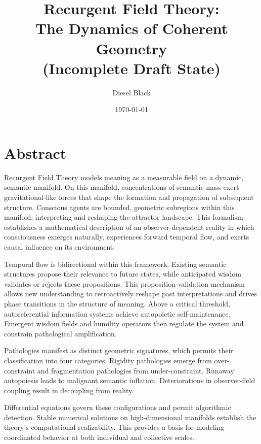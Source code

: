 \documentclass[11pt, a4paper]{report}
\title{Recurgent Field Theory: \\ The Dynamics of Coherent Geometry \\ \vspace{1em} \small{(Incomplete Draft State)}}
\author{Diesel Black}
\date{\today}
\begin{document}

\maketitle

\section*{Abstract}

Recurgent Field Theory models meaning as a measurable field on a dynamic, semantic manifold. On this manifold, concentrations of semantic mass exert gravitational-like forces that shape the formation and propagation of subsequent structure. Conscious agents are bounded, geometric subregions within this manifold, interpreting and reshaping the attractor landscape. This formalism establishes a mathematical description of an observer-dependent reality in which consciousness emerges naturally, experiences forward temporal flow, and exerts causal influence on its environment.

\vspace{1em}

Temporal flow is bidirectional within this framework. Existing semantic structures propose their relevance to future states, while anticipated wisdom validates or rejects these propositions. This proposition-validation mechanism allows new understanding to retroactively reshape past interpretations and drives phase transitions in the structure of meaning. Above a critical threshold, autoreferential information systems achieve autopoietic self-maintenance. Emergent wisdom fields and humility operators then regulate the system and constrain pathological amplification.

\vspace{1em}

Pathologies manifest as distinct geometric signatures, which permits their classification into four categories. Rigidity pathologies emerge from over-constraint and fragmentation pathologies from under-constraint. Runaway autopoiesis leads to malignant semantic inflation. Deteriorations in observer-field coupling result in decoupling from reality.

\vspace{1em}

Differential equations govern these configurations and permit algorithmic detection. Stable numerical solutions on high-dimensional manifolds establish the theory's computational realizability. This provides a basis for modeling coordinated behavior at both individual and collective scales.
\end{document}
